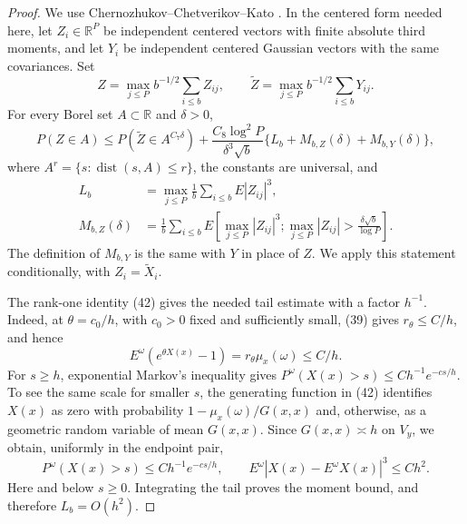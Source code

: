 \begin{proof}
We use Chernozhukov--Chetverikov--Kato
\cite[Theorem~3.1]{CCK2016}.  In the centered form needed here, let
$Z_i\in\mathbb R^P$ be independent centered vectors with finite
absolute third moments, and let $Y_i$ be independent centered
Gaussian vectors with the same covariances.  Set
\[
 Z=\max_{j\le P}b^{-1/2}\sum_{i\le b}Z_{ij},\qquad
 \widetilde Z=\max_{j\le P}b^{-1/2}\sum_{i\le b}Y_{ij}.
\]
For every Borel set $A\subset\mathbb R$ and $\delta>0$,
\begin{equation}
 P(Z\in A)\le P(\widetilde Z\in A^{C_7\delta})
 +\frac{C_8\log^2P}{\delta^3\sqrt b}
   \{L_b+M_{b,Z}(\delta)+M_{b,Y}(\delta)\},
 \tag{69}\label{eq:terminal-cck}
\end{equation}
where $A^r=\{s:\operatorname{dist}(s,A)\le r\}$, the constants
are universal, and
\[
 \begin{split}
 L_b&=\max_{j\le P}\frac1b\sum_{i\le b}E|Z_{ij}|^3,\\
 M_{b,Z}(\delta)
 &=\frac1b\sum_{i\le b}E\left[
   \max_{j\le P}|Z_{ij}|^3;
   \max_{j\le P}|Z_{ij}|>\frac{\delta\sqrt b}{\log P}\right].
 \end{split}
\]
The definition of $M_{b,Y}$ is the same with $Y$ in place of $Z$.
We apply this statement conditionally, with $Z_i=\widetilde X_i$.

The rank-one identity (42) gives the needed tail estimate with a
factor $h^{-1}$.  Indeed, at $\theta=c_0/h$, with $c_0>0$ fixed
and sufficiently small, (39) gives $r_\theta\le C/h$, and hence
\[
 E^\omega(e^{\theta X(x)}-1)
 =r_\theta\mu_x(\omega)\le C/h.
\]
For $s\ge h$, exponential Markov's inequality gives
$P^\omega(X(x)>s)\le Ch^{-1}e^{-cs/h}$.  To see the same scale
for smaller $s$, the generating function in (42) identifies
$X(x)$ as zero with probability $1-\mu_x(\omega)/G(x,x)$ and,
otherwise, as a geometric random variable of mean $G(x,x)$.
Since $G(x,x)\asymp h$ on $V_y$, we obtain, uniformly in the
endpoint pair,
\begin{equation}
 P^\omega(X(x)>s)\le Ch^{-1}e^{-cs/h},\qquad
 E^\omega|X(x)-E^\omega X(x)|^3\le Ch^2.
 \tag{71}\label{eq:terminal-bridge-tails}
\end{equation}
Here and below $s\ge0$.  Integrating the tail proves the moment
bound, and therefore $L_b=O(h^2)$.


\end{proof}
